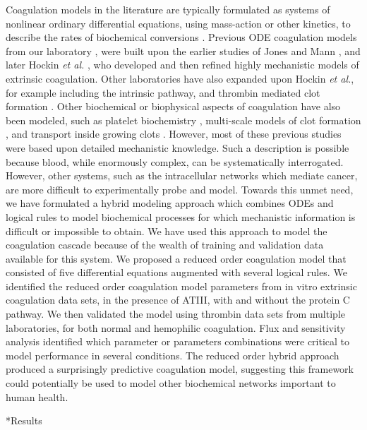 \documentclass[12pt]{article}
\makeatletter
\renewcommand\section{\@startsection
	{subsection}{2}{0mm}
	{-0.2in}
	{0.05\baselineskip}
	{\normalfont\large\bfseries}}
\makeatother
\begin{document}
Coagulation models in the literature are typically formulated as systems of nonlinear ordinary differential equations, 
using mass-action or other kinetics, to describe the rates of biochemical conversions \citep{Kuharsky:2001aa}.
Previous ODE coagulation models from our laboratory \citep{Luan:2007aa,2010_luan_varner_MolBioSys}, 
were built upon the earlier studies of Jones and Mann \citep{Jones:1994aa}, 
and later Hockin \emph{et al.} \citep{Hockin:2002aa}, who developed and then refined highly mechanistic models of extrinsic coagulation. 
Other laboratories have also expanded upon Hockin \emph{et al.}, for example including the intrinsic pathway, and thrombin mediated clot formation \citep{Chatterjee:2010aa}. 
Other biochemical or biophysical aspects of coagulation have also been modeled, such as platelet biochemistry \citep{Stalker:2013aa}, 
multi-scale models of clot formation \citep{Leiderman:2014aa, Bannish:2014ab}, and transport inside growing clots \citep{Voronov:2013aa}.
However, most of these previous studies were based upon detailed mechanistic knowledge. 
Such a description is possible because blood, while enormously complex, can be systematically interrogated. 
However, other systems, such as the intracellular networks which mediate cancer, are more difficult to experimentally probe and model.  
Towards this unmet need, we have formulated a hybrid modeling approach which combines ODEs and logical rules to model 
biochemical processes for which mechanistic information is difficult or impossible to obtain. 
We have used this approach to model the coagulation cascade because of the wealth of training and validation data available for this system. 
We proposed a reduced order coagulation model that consisted of five differential equations augmented with several logical rules.
We identified the reduced order coagulation model parameters from in vitro extrinsic coagulation data sets, in the presence of ATIII, with and without the protein C pathway. 
We then validated the model using thrombin data sets from multiple laboratories, for both normal and hemophilic coagulation.
Flux and sensitivity analysis identified which parameter or parameters combinations were critical to model performance in several conditions. 
The reduced order hybrid approach produced a surprisingly predictive coagulation model, suggesting this framework could potentially be used to model other biochemical networks important to human health. 

\clearpage

\section*{Results}
\end{document}
